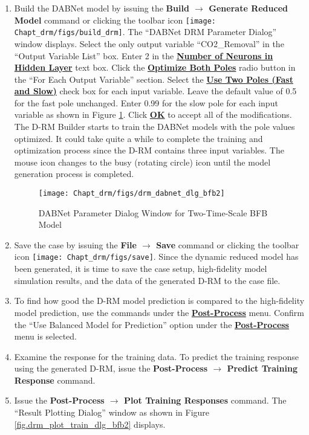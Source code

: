 \begin{enumerate}
	\item Build the DABNet model by issuing the \textbf{Build $\rightarrow$ Generate Reduced Model} command or clicking the toolbar icon \texttt{[image: Chapt\_drm/figs/build\_drm]}.  The ``DABNet DRM Parameter Dialog'' window displays.  Select the only output variable ``CO2\_Removal'' in the ``Output Variable List'' box.  Enter 2 in the \textbf{\underline{Number of Neurons in Hidden Layer}} text box.  Click the \textbf{\underline{Optimize Both Poles}} radio button in the ``For Each Output Variable'' section.  Select the \textbf{\underline{Use Two Poles (Fast and Slow)}} check box for each input variable.  Leave the default value of 0.5 for the fast pole unchanged.  Enter 0.99 for the slow pole for each input variable as shown in Figure \ref{fig.drm_dabnet_dlg_bfb2}.  Click \textbf{\underline{OK}}  to accept all of the modifications.  The D-RM Builder starts to train the DABNet models with the pole values optimized.  It could take quite a while to complete the training and optimization process since the D-RM contains three input variables.  The mouse icon changes to the busy (rotating circle) icon until the model generation process is completed.
	\begin{figure}[H]
		\begin{center}
			\texttt{[image: Chapt\_drm/figs/drm\_dabnet\_dlg\_bfb2]}
			\caption{DABNet Parameter Dialog Window for Two-Time-Scale BFB Model}
			\label{fig.drm_dabnet_dlg_bfb2}
		\end{center}
	\end{figure}
	\item Save the case by issuing the \textbf{File $\rightarrow$ Save} command or clicking the toolbar icon \texttt{[image: Chapt\_drm/figs/save]}.  Since the dynamic reduced model has been generated, it is time to save the case setup, high-fidelity model simulation results, and the data of the generated D-RM to the case file.
	\item To find how good the D-RM model prediction is compared to the high-fidelity model prediction, use the commands under the \textbf{\underline{Post-Process}} menu.  Confirm the ``Use Balanced Model for Prediction'' option under the \textbf{\underline{Post-Process}} menu is selected. 
	\item Examine the response for the training data.  To predict the training response using the generated D-RM, issue the \textbf{Post-Process $\rightarrow$ Predict Training Response} command.
	\item Issue the \textbf{Post-Process $\rightarrow$ Plot Training Responses} command.  The ``Result Plotting Dialog'' window as shown in Figure \ref{fig.drm_plot_train_dlg_bfb2} displays.

\end{enumerate}
